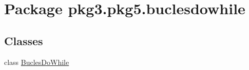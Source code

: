 \hypertarget{namespacepkg3_1_1pkg5_1_1buclesdowhile}{}\section{Package pkg3.\+pkg5.\+buclesdowhile}
\label{namespacepkg3_1_1pkg5_1_1buclesdowhile}
\subsection*{Classes}
\begin{DoxyCompactItemize}
\item 
class \mbox{\hyperlink{classpkg3_1_1pkg5_1_1buclesdowhile_1_1_bucles_do_while}{Bucles\+Do\+While}}
\end{DoxyCompactItemize}
